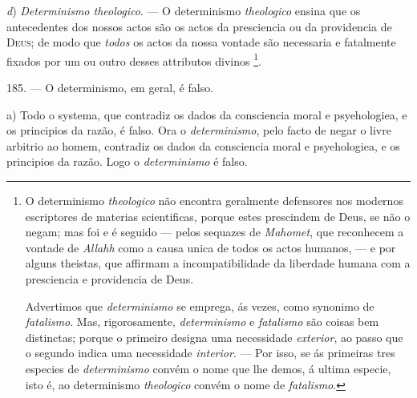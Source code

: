 \emph{d}) \emph{Determinismo theologico}. --- O determinismo \emph{theologico} ensina que os antecedentes dos nossos actos são os actos da presciencia ou da providencia de \textsc{Deus}; de modo que \emph{todos} os actos da nossa vontade são necessaria e fatalmente fixados por um ou outro desses attributos divinos \footnote{O determinismo \emph{theologico} não encontra geralmente defensores nos modernos escriptores de materias scientificas, porque estes prescindem de Deus, se não o negam; mas foi e é seguido --- pelos sequazes de \emph{Mahomet}, que reconhecem a vontade de \emph{Allahh} como a causa unica de todos os actos humanos, --- e por alguns theistas, que affirmam a incompatibilidade da liberdade humana com a presciencia e providencia de Deus.\par Advertimos que \emph{determinismo} se emprega, ás vezes, como synonimo de \emph{fatalismo}. Mas, rigorosamente, \emph{determinismo} e \emph{fatalismo} são coisas bem distinctas; porque o primeiro designa uma necessidade \emph{exterior}, ao passo que o segundo indica uma necessidade \emph{interior}. --- Por isso, se ás primeiras tres especies de \emph{determinismo} convém o nome que lhe demos, á ultima especie, isto é, ao determinismo \emph{theologico} convém o nome de \emph{fatalismo}.}.

185. --- O determinismo, em geral, é falso.

a) Todo o systema, que contradiz os dados da consciencia moral e psyehologiea, e os principios da razão, é falso. Ora o \emph{determinismo}, pelo facto de negar o livre arbitrio ao homem, contradiz os dados da consciencia moral e psyehologiea, e os principios da razão. Logo o \emph{determinismo} é falso.

